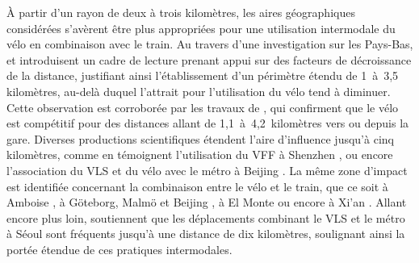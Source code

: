 \begin{refsegment}
À partir d'un rayon de deux à trois kilomètres, les aires géographiques considérées s'avèrent être plus appropriées pour une utilisation intermodale du vélo en combinaison avec le train. Au travers d'une investigation sur les Pays-Bas, \textcolor{blue}{\textcite[227]{keijer_how_2000}} et \textcolor{blue}{\textcite[73]{rietveld_accessibility_2000}} introduisent un cadre de lecture prenant appui sur des facteurs de décroissance de la distance, justifiant ainsi l'établissement d'un périmètre étendu de 1~à~3,5 kilomètres, au-delà duquel l'attrait pour l'utilisation du vélo tend à diminuer. Cette observation est corroborée par les travaux de \textcolor{blue}{\textcite[281]{debrezion_modelling_2009}}, qui confirment que le vélo est compétitif pour des distances allant de 1,1~à~4,2~kilomètres vers ou depuis la gare. Diverses productions scientifiques étendent l'aire d'influence jusqu'à cinq kilomètres, comme en témoignent l'utilisation du \acrshort{VFF} à Shenzhen \textcolor{blue}{\autocite[6]{wu_measuring_2019}}, ou encore l'association du \acrshort{VLS} et du vélo avec le métro à Beijing \textcolor{blue}{\autocite[54]{zhao_bicycle-metro_2017}}. La même zone d'impact est identifiée concernant la combinaison entre le vélo et le train, que ce soit à Amboise \textcolor{blue}{\autocite[751]{midenet_modal_2018}}, à Göteborg, Malmö et Beijing \textcolor{blue}{\autocite[15]{hamidi_shaping_2020}}, à El Monte \textcolor{blue}{\autocite[118]{cottrell_transforming_2007}} ou encore à Xi'an \textcolor{blue}{\autocite[172]{yang_bike-and-ride_2014}}. Allant encore plus loin, \textcolor{blue}{\textcite[9]{kim_analysis_2021}} soutiennent que les déplacements combinant le \acrshort{VLS} et le métro à Séoul sont fréquents jusqu'à une distance de dix kilomètres, soulignant ainsi la portée étendue de ces pratiques intermodales.%


\end{refsegment}
